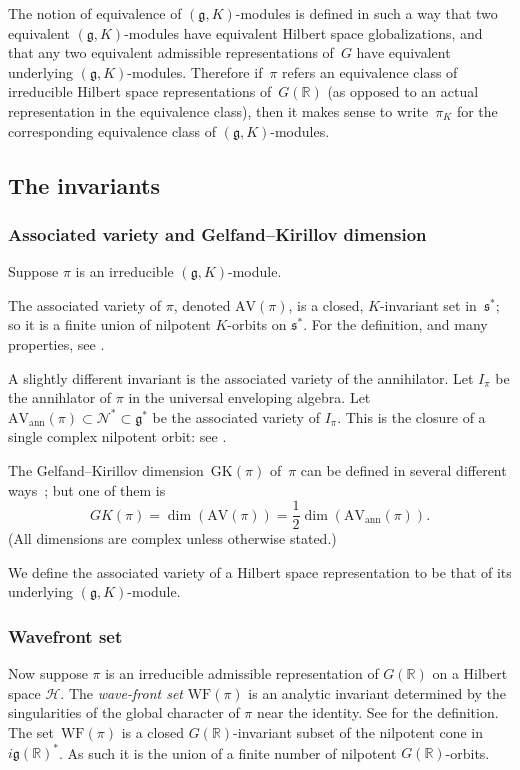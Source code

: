 \documentclass[10pt,leqno]{article}
\numberwithin{equation}{section}
\newcommand{\mH}{\mathcal H}
\newcommand{\R}{\mathbb R}
\newcommand{\N}{\mathcal N}
\newcommand{\g}{\mathfrak g}
\newcommand{\s}{\mathfrak s}
\newcommand{\AV}{\mathrm{AV}}
\newcommand{\WF}{\mathrm{WF}}
\newcommand{\AVann}{\mathrm{AV}_{\mathrm{ann}}}
\newcommand{\GK}{\mathrm{GK}}
\begin{document}
The notion of equivalence of $(\g, K)$-modules is defined in such a way that two equivalent $(\g, K)$-modules have equivalent Hilbert space globalizations, and that any two equivalent admissible representations of~$G$ have equivalent underlying $(\g, K)$-modules. Therefore if~$\pi$ refers an equivalence class of irreducible Hilbert space representations of~$G(\R)$ (as opposed to an actual representation in the equivalence class), then it makes sense to write~$\pi_K$ for the corresponding equivalence class of $(\g, K)$-modules.

\subsection{The invariants}\label{sec:invariants}


\subsubsection*{Associated variety and Gelfand--Kirillov dimension}


Suppose $\pi$ is an irreducible $(\g,K)$-module.

The associated variety of $\pi$, denoted $\AV(\pi)$, is a closed, $K$-invariant set in~$\s^*$; so it is a finite union of
nilpotent $K$-orbits on $\s^*$. For the definition, and many properties, see \cite[Section 5]{vogan_bowdoin}. 


A slightly different invariant is the associated variety of the annihilator. Let $I_\pi$ be the annihlator of $\pi$ in the universal enveloping algebra.
Let $\AVann(\pi)\subset\N^*\subset \g^*$ be the associated variety of $I_\pi$.
This is the closure of a single complex nilpotent orbit: see \cite[Section 1, Theorem 4.7]{vogan_bowdoin}.

The Gelfand--Kirillov dimension~$\GK(\pi)$ of~$\pi$ can be defined in several different ways~\cite{vogan-gelfand-kirillov}; but one of them is
$$
GK(\pi)=\dim(\AV(\pi))=\frac12\dim(\AVann(\pi)).
$$
(All dimensions are complex unless otherwise stated.)


We define the associated variety of a Hilbert space representation to be that of  its underlying $(\g,K)$-module.


\subsubsection*{Wavefront set}

Now suppose $\pi$ is an irreducible admissible representation of $G(\R)$ on a Hilbert space $\mH$. 
The \emph{wave-front
  set} $\WF(\pi)$ is an analytic invariant determined by the
singularities of the global character of $\pi$ near the identity. See \cite{howe_wave_front, bv_local_structure, HarrisHeOlafsson} for the definition. 
The set~$\WF(\pi)$  is a closed $G(\R)$-invariant subset of the nilpotent cone in
$i\g(\R)^*$. As such it is the union of a finite number of nilpotent $G(\R)$-orbits.
\end{document}
